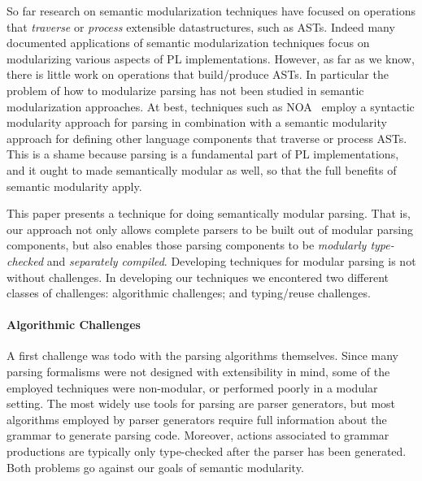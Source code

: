So far research on semantic modularization techniques have focused on
operations that \emph{traverse} or \emph{process} extensible
datastructures, such as ASTs. Indeed many documented applications of
semantic modularization techniques focus on modularizing various
aspects of PL implementations.  However, as far as we know, there is
little work on operations that build/produce ASTs.  In particular the
problem of how to modularize parsing has not been studied in semantic
modularization approaches. At best, techniques such as NOA~\cite{Gouseti2014}
employ a syntactic modularity approach for parsing in combination with 
a semantic modularity approach for defining other language components 
that traverse or process ASTs. This is a shame because parsing is a
fundamental part of PL implementations, and it ought to made
semantically modular as well, so that the full benefits of semantic 
modularity apply.


This paper presents a technique for doing semantically
modular parsing.  That is, our approach not only allows complete
parsers to be built out of modular parsing components, but also enables
those parsing components to be \emph{modularly type-checked} and
\emph{separately compiled}. Developing techniques for modular parsing 
is not without challenges. In developing our techniques we encontered 
two different classes of challenges: algorithmic challenges; and
typing/reuse challenges.

\paragraph{Algorithmic Challenges} A first challenge was todo with
  the parsing algorithms themselves. Since many parsing formalisms
  were not designed with extensibility in mind, some of the employed
  techniques were non-modular, or performed poorly in a modular
  setting.  The most widely use tools for parsing are parser
  generators, but most algorithms employed by parser generators
  require full information about the grammar to generate parsing
  code. Moreover, actions associated to grammar productions are
  typically only type-checked after the parser has been
  generated. Both problems go against our goals of semantic
  modularity. 

